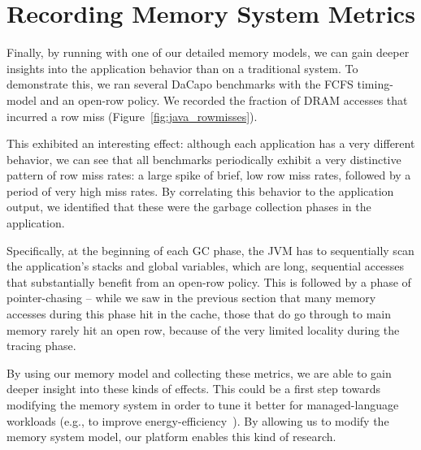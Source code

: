 \section{Recording Memory System Metrics}

Finally, by running with one of our detailed memory models, we can gain deeper
insights into the application behavior than on a traditional system. To
demonstrate this, we ran several DaCapo benchmarks with the FCFS timing-model
and an open-row policy. We recorded the fraction of DRAM accesses that incurred
a row miss (Figure~\ref{fig:java_rowmisses}).

This exhibited an interesting effect: although each application has a very
different behavior, we can see that all benchmarks periodically exhibit a very
distinctive pattern of row miss rates: a large spike of brief, low row miss
rates, followed by a period of very high miss rates. By correlating this
behavior to the application output, we identified that these were the garbage
collection phases in the application.

Specifically, at the beginning of each GC phase, the JVM has to sequentially
scan the application's stacks and global variables, which are long, sequential
accesses that substantially benefit from an open-row policy. This is followed
by a phase of pointer-chasing -- while we saw in the previous section that many
memory accesses during this phase hit in the cache, those that do go through to
main memory rarely hit an open row, because of the very limited locality during
the tracing phase.

By using our memory model and collecting these metrics, we are able to gain
deeper insight into these kinds of effects. This could be a first step towards
modifying the memory system in order to tune it better for managed-language
workloads (e.g., to improve
energy-efficiency~\cite{Cao:2012:YYP:2337159.2337185}). By allowing us to
modify the memory system model, our platform enables this kind of research.
